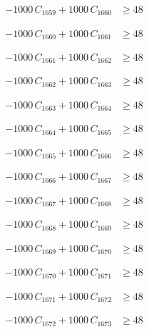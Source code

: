 \documentclass[a4paper,11pt]{article}
\begin{document}
\begin{align}
-1000\,C_{1659} + 1000\,C_{1660} &\geq 48 \nonumber
\end{align}

\begin{align}
-1000\,C_{1660} + 1000\,C_{1661} &\geq 48 \nonumber
\end{align}

\begin{align}
-1000\,C_{1661} + 1000\,C_{1662} &\geq 48 \nonumber
\end{align}

\begin{align}
-1000\,C_{1662} + 1000\,C_{1663} &\geq 48 \nonumber
\end{align}

\begin{align}
-1000\,C_{1663} + 1000\,C_{1664} &\geq 48 \nonumber
\end{align}

\begin{align}
-1000\,C_{1664} + 1000\,C_{1665} &\geq 48 \nonumber
\end{align}

\begin{align}
-1000\,C_{1665} + 1000\,C_{1666} &\geq 48 \nonumber
\end{align}

\begin{align}
-1000\,C_{1666} + 1000\,C_{1667} &\geq 48 \nonumber
\end{align}

\begin{align}
-1000\,C_{1667} + 1000\,C_{1668} &\geq 48 \nonumber
\end{align}

\begin{align}
-1000\,C_{1668} + 1000\,C_{1669} &\geq 48 \nonumber
\end{align}

\begin{align}
-1000\,C_{1669} + 1000\,C_{1670} &\geq 48 \nonumber
\end{align}

\begin{align}
-1000\,C_{1670} + 1000\,C_{1671} &\geq 48 \nonumber
\end{align}

\begin{align}
-1000\,C_{1671} + 1000\,C_{1672} &\geq 48 \nonumber
\end{align}

\begin{align}
-1000\,C_{1672} + 1000\,C_{1673} &\geq 48 \nonumber
\end{align}
\end{document}

